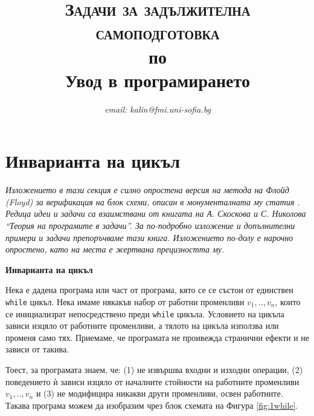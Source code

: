 \documentclass[12pt,a4paper]{article}
\author{\textit{email: kalin@fmi.uni-sofia.bg}}
\title{\textsc{Задачи за задължителна самоподготовка} \\
по \\
Увод в програмирането}
\newcommand{\code}[1]{\texttt{#1}}
\begin{document}
\maketitle

\section{Инварианта на цикъл}

\emph{Изложението в тази секция е силно опростена версия на метода на Флойд (Floyd) за верификация на блок схеми, описан в монументалната му статия \cite{floyd}. Редица идеи и задачи са взаимствани от книгата \cite{tpsbornik} на А. Скоскова и С. Николова ``Теория на програмите в задачи''. За по-подробно изложение и допълнителни примери и задачи препоръчваме тази книга. Изложението по-долу е нарочно опростено, като на места е жертвана прецизността му.}

\begin{mdframed}[hidealllines=true,backgroundcolor=gray!20]


\bigskip
\textbf{Инварианта на цикъл}
\bigskip


Нека е дадена програма или част от програма, кято се се състои от единствен \code{while} цикъл. Нека имаме някакъв набор от работни променливи $v_1,..,v_n$, които се инициализрат непосредствено преди \code {while} цикъла. Условието на цикъла зависи изцяло от работните променливи, а тялото на цикъла използва или променя само тях. Приемаме, че програмата не проивежда странични ефекти и не зависи от такива.

Тоест, за програмата знаем, че: (1) не извършва входни и изходни операции, (2) поведението ѝ зависи изцяло от началните стойности на работните променливи $v_1,..,v_n$ и (3) не модифицира никакви други променливи, освен работните. Такава програма можем да изобразим чрез блок схемата на Фигура \ref{fig:1while}.
\end{mdframed}
\end{document}
